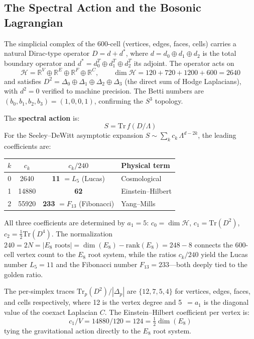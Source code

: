 \documentclass[12pt,a4paper]{article}
\theoremstyle{definition}
\begin{document}
\subsection{The Spectral Action and the Bosonic Lagrangian}
\label{sec:spectral_action}

The simplicial complex of the 600-cell (vertices, edges, faces, cells) carries a natural Dirac-type operator $D = d + d^*$, where $d = d_0 \oplus d_1 \oplus d_2$ is the total boundary operator and $d^* = d_0^T \oplus d_1^T \oplus d_2^T$ its adjoint. The operator acts on
\begin{equation}
\mathcal{H} = \mathbb{R}^V \oplus \mathbb{R}^E \oplus \mathbb{R}^F \oplus \mathbb{R}^C, \qquad \dim \mathcal{H} = 120 + 720 + 1200 + 600 = 2640
\end{equation}
and satisfies $D^2 = \Delta_0 \oplus \Delta_1 \oplus \Delta_2 \oplus \Delta_3$ (the direct sum of Hodge Laplacians), with $d^2 = 0$ verified to machine precision. The Betti numbers are $(b_0, b_1, b_2, b_3) = (1, 0, 0, 1)$, confirming the $S^3$ topology.

The \textbf{spectral action} \cite{chamseddine1997} is:
\begin{equation}
\boxed{S = \mathrm{Tr}\,f(D/\Lambda)}
\label{eq:spectral_action}
\end{equation}
For the Seeley--DeWitt asymptotic expansion $S \sim \sum_k c_k\,\Lambda^{d-2k}$, the leading coefficients are:
\begin{center}
\begin{tabular}{cccl}
\toprule
$k$ & $c_k$ & $c_k / 240$ & Physical term \\
\midrule
0 & 2640 & \textbf{11} $= L_5$ (Lucas) & Cosmological \\
1 & 14880 & \textbf{62} & Einstein--Hilbert \\
2 & 55920 & \textbf{233} $= F_{13}$ (Fibonacci) & Yang--Mills \\
\bottomrule
\end{tabular}
\end{center}
All three coefficients are determined by $a_1 = 5$: $c_0 = \dim\mathcal{H}$, $c_1 = \mathrm{Tr}(D^2)$, $c_2 = \tfrac{1}{2}\mathrm{Tr}(D^4)$. The normalization $240 = 2N = |E_8\text{ roots}| = \dim(E_8) - \mathrm{rank}(E_8) = 248 - 8$ connects the 600-cell vertex count to the $E_8$ root system, while the ratios $c_k/240$ yield the Lucas number $L_5 = 11$ and the Fibonacci number $F_{13} = 233$---both deeply tied to the golden ratio.

The per-simplex traces $\mathrm{Tr}_p(D^2) / |\Delta_p|$ are $\{12, 7, 5, 4\}$ for vertices, edges, faces, and cells respectively, where 12 is the vertex degree and 5~$= a_1$ is the diagonal value of the coexact Laplacian $C$. The Einstein--Hilbert coefficient per vertex is:
\begin{equation}
c_1 / V = 14880 / 120 = 124 = \tfrac{1}{2}\dim(E_8)
\end{equation}
tying the gravitational action directly to the $E_8$ root system.
\end{document}

